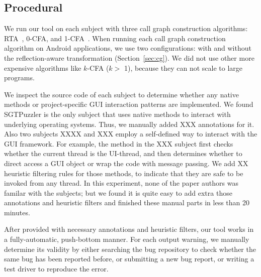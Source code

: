 \subsection{Procedural}
\label{sec:procedural}

We run our tool on each subject with three call graph construction
algorithms: RTA~\cite{rta}, 0-CFA, and 1-CFA~\cite{kcfa}.  When running
each call graph construction algorithm on Android applications, we
use two configurations: with and without the reflection-aware transformation
(Section~\ref{sec:cg}).  We did not use other more expensive algorithms like $k$-CFA ($k >$ 1),
because they can not scale to large programs.

We inspect the source code of each subject to determine whether any
native methods or project-specific GUI interaction patterns are implemented.
We found SGTPuzzler is the only subject that uses native methods to interact with
underlying operating systems. Thus, we manually added XXX 
annotations for it. Also two subjects XXXX and XXX employ a self-defined
way to interact with the GUI framework. For example, the 
method in the XXX subject first checks whether the current thread is the UI-thread, and
then determines whether to direct access a GUI object or wrap the code with
message passing. We add XX heuristic filtering rules for those methods, to indicate
that they are safe to be invoked from any thread. In this experiment, none of the paper
authors was familar with the subjects; but we found it is quite easy
to add extra those annotations and heuristic filters and finished these
manual parts in less than 20 minutes.

After provided with necessary annotations and heuristic filters,
our tool works in a fully-automatic, push-bottom manner. For each output
warning, we manually determine its validity by either searching the
bug repository to check whether the same bug has been reported before,
or submitting a new bug report, or writing a test driver to reproduce
the error.



